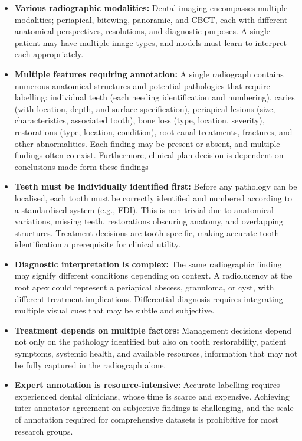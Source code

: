 \documentclass[12pt,a4paper]{report}
\begin{document}
	\begin{itemize}
		\item \textbf{Various radiographic modalities:} Dental imaging encompasses multiple modalities; periapical, bitewing, panoramic, and CBCT, each with different anatomical perspectives, resolutions, and diagnostic purposes. A single patient may have multiple image types, and models must learn to interpret each appropriately.
		
		\item \textbf{Multiple features requiring annotation:} A single radiograph contains numerous anatomical structures and potential pathologies that require labelling: individual teeth (each needing identification and numbering), caries (with location, depth, and surface specification), periapical lesions (size, characteristics, associated tooth), bone loss (type, location, severity), restorations (type, location, condition), root canal treatments, fractures, and other abnormalities. Each finding may be present or absent, and multiple findings often co-exist. Furthermore, clinical plan decision is dependent on conclusions made form these findings
		
		\item \textbf{Teeth must be individually identified first:} Before any pathology can be localised, each tooth must be correctly identified and numbered according to a standardised system (e.g., FDI). This is non-trivial due to anatomical variations, missing teeth, restorations obscuring anatomy, and overlapping structures. Treatment decisions are tooth-specific, making accurate tooth identification a prerequisite for clinical utility.
		
		\item \textbf{Diagnostic interpretation is complex:} The same radiographic finding may signify different conditions depending on context. A radiolucency at the root apex could represent a periapical abscess, granuloma, or cyst, with different treatment implications. Differential diagnosis requires integrating multiple visual cues that may be subtle and subjective.
		
		\item \textbf{Treatment depends on multiple factors:} Management decisions depend not only on the pathology identified but also on tooth restorability, patient symptoms, systemic health, and available resources, information that may not be fully captured in the radiograph alone.
		
		\item \textbf{Expert annotation is resource-intensive:} Accurate labelling requires experienced dental clinicians, whose time is scarce and expensive. Achieving inter-annotator agreement on subjective findings is challenging, and the scale of annotation required for comprehensive datasets is prohibitive for most research groups.
	\end{itemize}
	
\end{document}
